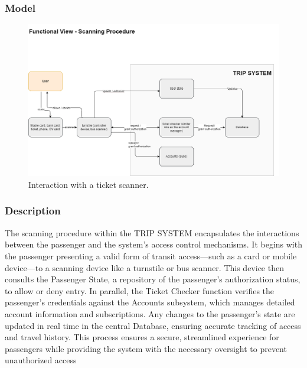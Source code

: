 \subsubsection{Model}
\begin{figure}[H]
    \centering
    \includegraphics[width=\textwidth]{drawings/views_final_version/functional_view scanning.png}
    \caption{Interaction with a ticket scanner.}
    \label{fig:ticket_scanner}
\end{figure}

\subsubsection{Description}
The scanning procedure within the TRIP SYSTEM encapsulates the interactions between the passenger and the system's access control mechanisms. It begins with the passenger presenting a valid form of transit access—such as a card or mobile device—to a scanning device like a turnstile or bus scanner. This device then consults the Passenger State, a repository of the passenger's authorization status, to allow or deny entry. In parallel, the Ticket Checker function verifies the passenger's credentials against the Accounts subsystem, which manages detailed account information and subscriptions. Any changes to the passenger's state are updated in real time in the central Database, ensuring accurate tracking of access and travel history. This process ensures a secure, streamlined experience for passengers while providing the system with the necessary oversight to prevent unauthorized access

